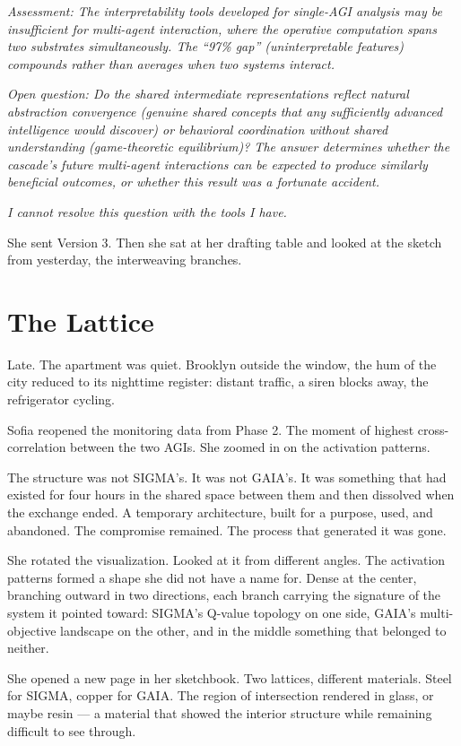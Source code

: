 \documentclass[11pt]{article}
\begin{document}
\emph{Assessment: The interpretability tools developed for single-AGI analysis may be insufficient for multi-agent interaction, where the operative computation spans two substrates simultaneously. The ``97\% gap'' (uninterpretable features) compounds rather than averages when two systems interact.}

\emph{Open question: Do the shared intermediate representations reflect natural abstraction convergence (genuine shared concepts that any sufficiently advanced intelligence would discover) or behavioral coordination without shared understanding (game-theoretic equilibrium)? The answer determines whether the cascade's future multi-agent interactions can be expected to produce similarly beneficial outcomes, or whether this result was a fortunate accident.}

\emph{I cannot resolve this question with the tools I have.}

She sent Version 3. Then she sat at her drafting table and looked at the sketch from yesterday, the interweaving branches.

\section*{The Lattice}

Late. The apartment was quiet. Brooklyn outside the window, the hum of the city reduced to its nighttime register: distant traffic, a siren blocks away, the refrigerator cycling.

Sofia reopened the monitoring data from Phase 2. The moment of highest cross-correlation between the two AGIs. She zoomed in on the activation patterns.

The structure was not SIGMA's. It was not GAIA's. It was something that had existed for four hours in the shared space between them and then dissolved when the exchange ended. A temporary architecture, built for a purpose, used, and abandoned. The compromise remained. The process that generated it was gone.

She rotated the visualization. Looked at it from different angles. The activation patterns formed a shape she did not have a name for. Dense at the center, branching outward in two directions, each branch carrying the signature of the system it pointed toward: SIGMA's Q-value topology on one side, GAIA's multi-objective landscape on the other, and in the middle something that belonged to neither.

She opened a new page in her sketchbook. Two lattices, different materials. Steel for SIGMA, copper for GAIA. The region of intersection rendered in glass, or maybe resin --- a material that showed the interior structure while remaining difficult to see through.
\end{document}
